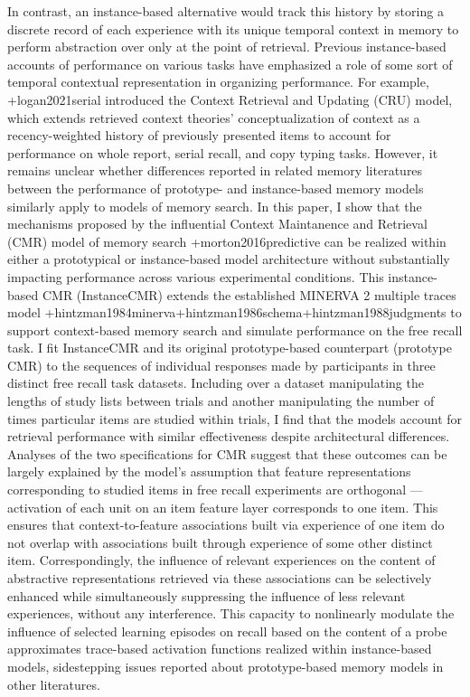 {}In contrast, an instance-based alternative would track this history by storing a discrete record of each experience with its unique temporal context in memory to perform abstraction over only at the point of retrieval. Previous instance-based accounts of performance on various tasks have emphasized a role of some sort of temporal contextual representation in organizing performance. For example, +{}{}{logan2021serial} introduced the Context Retrieval and Updating (CRU) model, which extends retrieved context theories' conceptualization of context as a recency-weighted history of previously presented items to account for performance on whole report, serial recall, and copy typing tasks. However, it remains unclear whether differences reported in related memory literatures between the performance of prototype- and instance-based memory models similarly apply to models of memory search.\markdownRendererInterblockSeparator
{}In this paper, I show that the mechanisms proposed by the influential Context Maintanence and Retrieval (CMR) model of memory search +{}{}{morton2016predictive} can be realized within either a prototypical or instance-based model architecture without substantially impacting performance across various experimental conditions. This instance-based CMR (InstanceCMR) extends the established MINERVA 2 multiple traces model +{}{}{hintzman1984minerva}+{}{}{hintzman1986schema}+{}{}{hintzman1988judgments} to support context-based memory search and simulate performance on the free recall task. I fit InstanceCMR and its original prototype-based counterpart (prototype CMR) to the sequences of individual responses made by participants in three distinct free recall task datasets. Including over a dataset manipulating the lengths of study lists between trials and another manipulating the number of times particular items are studied within trials, I find that the models account for retrieval performance with similar effectiveness despite architectural differences.\markdownRendererInterblockSeparator
{}Analyses of the two specifications for CMR suggest that these outcomes can be largely explained by the model's assumption that feature representations corresponding to studied items in free recall experiments are orthogonal --- activation of each unit on an item feature layer corresponds to one item. This ensures that context-to-feature associations built via experience of one item do not overlap with associations built through experience of some other distinct item. Correspondingly, the influence of relevant experiences on the content of abstractive representations retrieved via these associations can be selectively enhanced while simultaneously suppressing the influence of less relevant experiences, without any interference. This capacity to nonlinearly modulate the influence of selected learning episodes on recall based on the content of a probe approximates trace-based activation functions realized within instance-based models, sidestepping issues reported about prototype-based memory models in other literatures.\relax